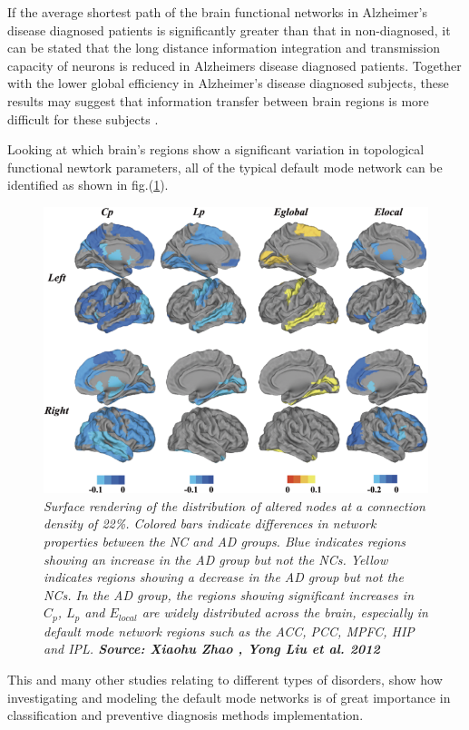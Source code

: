 \documentclass[12pt,openright,twoside,a4paper]{book}
\begin{document}
If the average shortest path of the brain functional networks in Alzheimer's disease diagnosed patients is significantly greater than that in non-diagnosed, it can be stated that the long distance information integration and transmission capacity of neurons is reduced in Alzheimers disease diagnosed patients.
Together with the lower global efficiency in Alzheimer's disease diagnosed subjects, these results may suggest that information transfer between brain regions is more difficult for these subjects \cite{ssa}.

Looking at which  brain's regions show a significant variation in topological functional newtork parameters, all of the typical default mode network can be identified as shown in fig.(\ref{rsz}).

\begin{figure}[!h]
\centering
\includegraphics[scale=0.5]{rsz}
\caption{\textit{Surface rendering of the distribution of altered nodes at a connection density of 22\%.
Colored bars indicate differences in network properties between the NC and AD groups. Blue indicates regions showing an increase in the AD group but not the NCs. Yellow indicates regions showing a decrease in the AD group but not the NCs. In the AD group, the regions showing significant increases in $C_p$, $L_p$ and $E_{local}$ are widely distributed across the brain, especially in default mode network regions such as the ACC, PCC, MPFC, HIP and IPL. \textbf{Source: Xiaohu Zhao , Yong Liu et al. 2012 \cite{ssa}}}}
\label{rsz}
\end{figure}

This and many other studies relating to different types of disorders, show how investigating and modeling the default mode networks is of great importance in classification and preventive diagnosis methods implementation.
\end{document}
